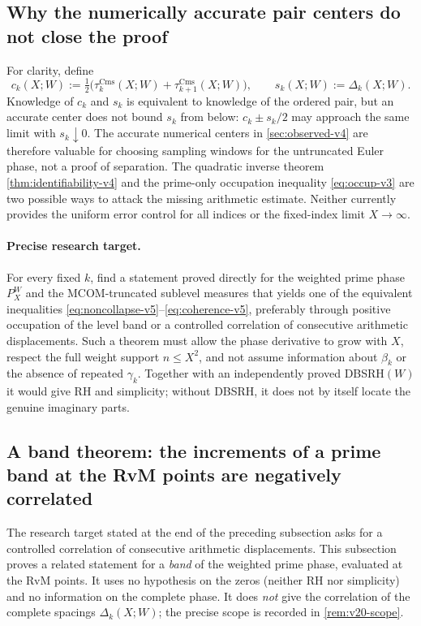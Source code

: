\documentclass[11pt,a4paper]{article}
\numberwithin{equation}{section}
\theoremstyle{definition}
\theoremstyle{remark}
\newcommand{\Cms}{\mathrm{Cms}}
\begin{document}
\subsection{Why the numerically accurate pair centers do not close the proof}
For clarity, define
\begin{equation}\label{eq:center-v5}
 c_k(X;W):=\tfrac12\bigl(\tau_k^{\Cms}(X;W)
 +\tau_{k+1}^{\Cms}(X;W)\bigr),\qquad
 s_k(X;W):=\Delta_k(X;W).
\end{equation}
Knowledge of $c_k$ and $s_k$ is equivalent to knowledge of the
ordered pair, but an accurate center does not bound $s_k$ from below:
$c_k\pm s_k/2$ may approach the same limit with $s_k\downarrow0$.
The accurate numerical centers in \cref{sec:observed-v4} are therefore
valuable for choosing sampling windows for the untruncated Euler
phase, not a proof of separation.  The quadratic inverse theorem
\cref{thm:identifiability-v4} and the prime-only occupation inequality
\eqref{eq:occup-v3} are two possible ways to attack the missing
arithmetic estimate.  Neither currently provides the uniform error
control for all indices or the fixed-index limit $X\to\infty$.

\paragraph{Precise research target.}
For every fixed $k$, find a statement proved directly for the
weighted prime phase $P_X^W$ and the MCOM-truncated sublevel measures
that yields one of the equivalent inequalities
\eqref{eq:noncollapse-v5}--\eqref{eq:coherence-v5}, preferably through
positive occupation of the level band or a controlled correlation of
consecutive arithmetic displacements.  Such a theorem must allow the
phase derivative to grow with $X$, respect the full weight support
$n\le X^2$, and not assume information about $\beta_k$ or the
absence of repeated $\gamma_k$.  Together with an independently
proved DBSRH$(W)$ it would give RH and simplicity; without DBSRH,
it does not by itself locate the genuine imaginary parts.

\subsection{A band theorem: the increments of a prime band at the RvM points are negatively correlated}\label{sec:v20-band}
The research target stated at the end of the preceding subsection asks for a controlled correlation of consecutive arithmetic displacements. This subsection proves a related statement for a \emph{band} of the weighted prime phase, evaluated at the RvM points. It uses no hypothesis on the zeros (neither RH nor simplicity) and no information on the complete phase. It does \emph{not} give the correlation of the complete spacings $\Delta_k(X;W)$; the precise scope is recorded in \cref{rem:v20-scope}.
\end{document}
